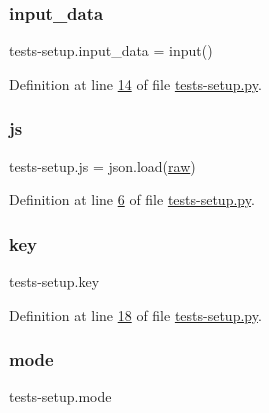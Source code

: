 \subsubsection{\texorpdfstring{input\+\_\+data}{input\_data}}
{\footnotesize\ttfamily tests-\/setup.\+input\+\_\+data = input()}



Definition at line \mbox{\hyperlink{tests-setup_8py_source_l00014}{14}} of file \mbox{\hyperlink{tests-setup_8py_source}{tests-\/setup.\+py}}.

\mbox{\label{namespacetests-setup_a94275a2f2d070d13dedc7e8dfaf4faa0}} 
\subsubsection{\texorpdfstring{js}{js}}
{\footnotesize\ttfamily tests-\/setup.\+js = json.\+load(\mbox{\hyperlink{namespacetests-setup_a16d40f6dd9430f3bdc79db2d00aab267}{raw}})}



Definition at line \mbox{\hyperlink{tests-setup_8py_source_l00006}{6}} of file \mbox{\hyperlink{tests-setup_8py_source}{tests-\/setup.\+py}}.

\mbox{\label{namespacetests-setup_a3a21e3298c630c17fc27ca5ab146a8af}} 
\subsubsection{\texorpdfstring{key}{key}}
{\footnotesize\ttfamily tests-\/setup.\+key}



Definition at line \mbox{\hyperlink{tests-setup_8py_source_l00018}{18}} of file \mbox{\hyperlink{tests-setup_8py_source}{tests-\/setup.\+py}}.

\mbox{\label{namespacetests-setup_a04126d10edec6b3171e1b55a00309b23}} 
\subsubsection{\texorpdfstring{mode}{mode}}
{\footnotesize\ttfamily tests-\/setup.\+mode}



